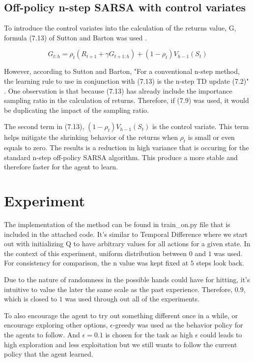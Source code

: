 \documentclass{article}
\begin{document}
\subsection{Off-policy n-step SARSA with control variates}
To introduce the control variates into the calculation of the returns value, G,
formula (7.13) of Sutton and Barton was used \citep{sutton_barton}.

\[
  G_{t:h}=\rho_t(R_{t+1}+\gamma G_{t+1:h})+(1-\rho_t)V_{h-1}(S_t)
\]

However, according to Sutton and Barton, "For a conventional n-step method, the
learning rule to use in conjunction with (7.13) is the n-step TD update
(7.2)" \citep{sutton_barton}.
One observation is that because (7.13) has already include the importance
sampling ratio in the calculation of returns. Therefore, if (7.9) was used, it
would be duplicating the impact of the sampling ratio.

The second term in (7.13), $(1-\rho_t)V_{h-1}(S_t)$ is the control variate. This
term helps mitigate the shrinking behavior of the returns when $\rho_t$ is small
or even equals to zero. The results is a reduction in high variance that is occuring for the
standard n-step off-policy SARSA algorithm. This produce a more stable and
therefore faster for the agent to learn. 

\section{Experiment}
The implementation of the method can be found in train\_on.py file that is
included in the attached code. It's similar to Temporal Difference where we
start out with initializing Q to have arbitrary values for all actions for a
given state. In the context of this experiment, uniform distribution between $0$ and $1$ was used.
For consistency for comparison, the n value was kept fixed at $5$ steps
look back.

Due to the nature of randomness in the possible hands could have for hitting,
it's intuitive to value the later the same scale as the past experience.
Therefore, $0.9$, which is closed to $1$ was used through out all of the
experiments.

To also encourage the agent to try out something different once in a while, or
encourage exploring other options, $\epsilon$-greedy was used as the behavior
policy for the agents to follow. And $\epsilon = 0.1$ is chosen for the task as
high $\epsilon$ could leads to high exploration and less exploitation but we
still wants to follow the current policy that the agent learned.
\end{document}
